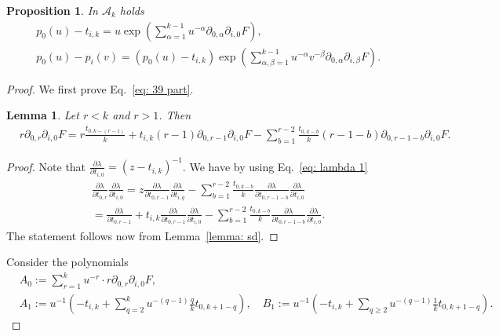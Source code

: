 \documentclass[12pt,a4paper]{amsart}
\def\A{{\mathcal A}}
\newcommand{\p}{{\partial}}
\newcommand{\<}{\left<}
\renewcommand{\>}{\right>}
\newtheorem{proposition}[theorem]{Proposition}
\newtheorem{lemma}[theorem]{Lemma}
\numberwithin{equation}{section}
\begin{document}
\begin{proposition}\label{prop: Eq. 39}
    In $\A_k$ holds
    \begin{align}
        & p_0(u) - t_{i,k} = u \exp\left( \sum_{\alpha=1}^{k-1} u^{-\alpha} \p_{0,\alpha}\p_{i,0}F \right),
        \label{eq: 39 part}
        \\
        & p_0(u) - p_i(v) = (p_0(u) - t_{i,k}) \exp\left( \sum_{\alpha,\beta=1}^{k-1} u^{-\alpha} v^{-\beta} \p_{0,\alpha}\p_{i,\beta} F \right).
        \label{eq: 39 full}
    \end{align}
\end{proposition}
\begin{proof}
We first prove Eq.~\eqref{eq: 39 part}.

\begin{lemma}
    Let $r < k$ and $r > 1$. Then
    \begin{align*}
        & r \p_{0,r}\p_{i,0} F
        = r \frac{t_{0,k-(r-1)}}{k}  + t_{i,k} (r-1) \p_{0,r-1}\p_{i,0} F - \sum_{b=1}^{r-2} \frac{t_{0,k-b}}{k} (r-1-b) \p_{0,r-1-b} \p_{i,0} F.
    \end{align*}
\end{lemma}
\begin{proof}
    Note that $\frac{\p \lambda}{\p t_{i,0}} = (z - t_{i,k})^{-1}$.
    We have by using Eq.~\eqref{eq: lambda 1}
    \begin{align*}
        & \frac{\p \lambda}{\p t_{0,r}} \frac{\p \lambda}{\p t_{i,0}} = 
        z \frac{\p \lambda}{\p t_{0,r-1}} \frac{\p \lambda}{\p t_{i,q}} 
        - \sum_{b=1}^{r-2} \frac{t_{0,k-b}}{k} \frac{\p \lambda}{\p t_{0,r-1-b}} \frac{\p \lambda}{\p t_{i,0}} 
        \\
        & = \frac{\p \lambda}{\p t_{0,r-1}}  
        + t_{i,k} \frac{\p \lambda}{\p t_{0,r-1}} \frac{\p \lambda}{\p t_{i,0}} 
        - \sum_{b=1}^{r-2} \frac{t_{0,k-b}}{k} \frac{\p \lambda}{\p t_{0,r-1-b}} \frac{\p \lambda}{\p t_{i,0}}.
    \end{align*}
    The statement follows now from Lemma~\ref{lemma: sd}.    
\end{proof}

Consider the polynomials
\begin{align*}
    & A_0 := \sum_{r=1}^k u^{-r} \cdot r \p_{0,r}\p_{i,0} F,
    \\
    & A_1 := u^{-1} \left( -t_{i,k} + \sum_{q=2}^k u^{-(q-1)} \frac{q}{k} t_{0,k+1-q}\right),
    \quad B_1 := u^{-1} \left(-t_{i,k} + \sum_{q\ge 2} u^{-(q-1)} \frac{1}{k} t_{0,k+1-q} \right).
\end{align*}


\end{proof}
\end{document}
